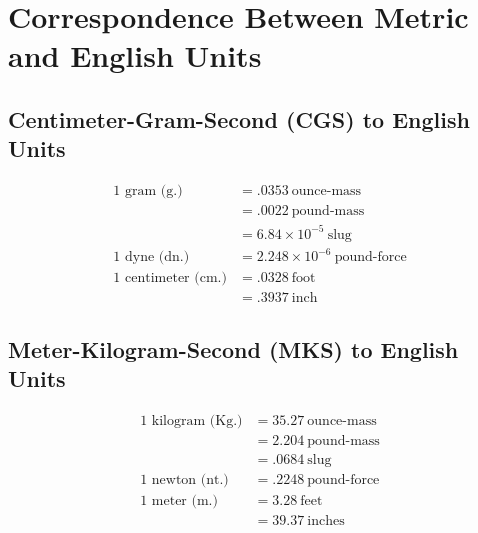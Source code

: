 \chapter{Correspondence Between Metric and English Units}\label{appA}

\section{Centimeter-Gram-Second (CGS) to English Units}\label{appA:sec:1}
\begin{align*}
  \text{1 gram (g.)} &= .0353\ \text{ounce-mass}\\
                     &= .0022\ \text{pound-mass}\\
                     &= 6.84\times 10^{-5}\ \text{slug}\\
  \text{1 dyne (dn.)} &= 2.248\times 10^{-6}\ \text{pound-force}\\
  \text{1 centimeter (cm.)} &= .0328\ \text{foot}\\
                            &= .3937\ \text{inch}
\end{align*}

\section{Meter-Kilogram-Second (MKS) to English Units}\label{appA:sec:2}
\begin{align*}
  \text{1 kilogram (Kg.)} &= 35.27\ \text{ounce-mass}\\
                          &= 2.204\ \text{pound-mass}\\
                          &= .0684\ \text{slug}\\
  \text{1 newton (nt.)} &= .2248\ \text{pound-force}\\
  \text{1 meter (m.)} &= 3.28\ \text{feet}\\
                      &= 39.37\ \text{inches}
\end{align*}
